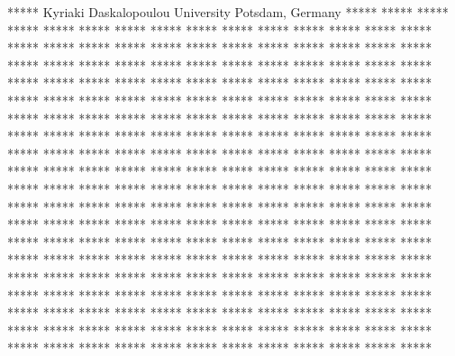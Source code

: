 \begin{conf-abstract}
{*****}
{Kyriaki Daskalopoulou}
{University Potsdam, Germany}
{***** ***** ***** ***** ***** ***** ***** ***** ***** ***** ***** ***** ***** ***** ***** ***** ***** ***** ***** ***** ***** ***** ***** ***** ***** ***** ***** ***** ***** ***** ***** ***** ***** ***** ***** ***** ***** ***** ***** ***** ***** ***** ***** ***** ***** ***** ***** ***** ***** ***** ***** ***** ***** ***** ***** ***** ***** ***** ***** ***** ***** ***** ***** ***** ***** ***** ***** ***** ***** ***** ***** ***** ***** ***** ***** ***** ***** ***** ***** ***** ***** ***** ***** ***** ***** ***** ***** ***** ***** ***** ***** ***** ***** ***** ***** ***** ***** ***** ***** ***** ***** ***** ***** ***** ***** ***** ***** ***** ***** ***** ***** ***** ***** ***** ***** ***** ***** ***** ***** ***** ***** ***** ***** ***** ***** ***** ***** ***** ***** ***** ***** ***** ***** ***** ***** ***** ***** ***** ***** ***** ***** ***** ***** ***** ***** ***** ***** ***** ***** ***** ***** ***** ***** ***** ***** ***** ***** ***** ***** ***** ***** ***** ***** ***** ***** ***** ***** ***** ***** ***** ***** ***** ***** ***** ***** ***** ***** ***** ***** ***** ***** ***** ***** ***** ***** ***** ***** ***** ***** ***** ***** ***** ***** ***** ***** ***** ***** ***** ***** ***** ***** ***** ***** ***** ***** ***** ***** ***** ***** ***** ***** ***** ***** ***** ***** ***** ***** ***** ***** ***** ***** ***** ***** ***** ***** ***** ***** ***** ***** ***** *****}
\end{conf-abstract}
